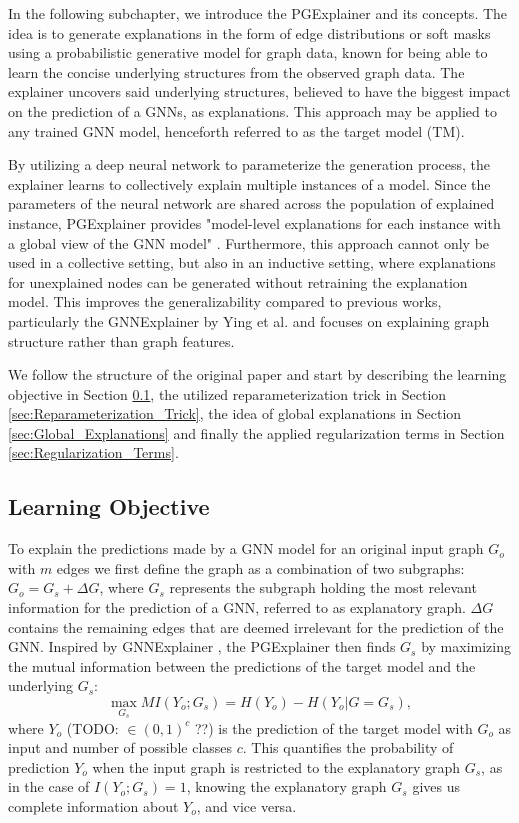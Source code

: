 In the following subchapter, we introduce the PGExplainer \cite{luo2020parameterized} and its concepts. The idea is to generate explanations in the form of edge distributions or soft masks using a probabilistic generative model for graph data, known for being able to learn the concise underlying structures from the observed graph data. The explainer uncovers said underlying structures, believed to have the biggest impact on the prediction of a GNNs, as explanations. This approach may be applied to any trained GNN model, henceforth referred to as the target model (TM). 

By utilizing a deep neural network to parameterize the generation process, the explainer learns to collectively explain multiple instances of a model. Since the parameters of the neural network are shared across the population of explained instance, PGExplainer provides "model-level explanations for each instance with a global view of the GNN model" \cite{luo2020parameterized}. Furthermore, this approach cannot only be used in a collective setting, but also in an inductive setting, where explanations for unexplained nodes can be generated without retraining the explanation model. This improves the generalizability compared to previous works, particularly the GNNExplainer by Ying et al. \cite{ying2019gnnexplainer} and focuses on explaining graph structure rather than graph features. \bigskip

We follow the structure of the original paper \cite{luo2020parameterized} and start by describing the learning objective in Section \ref{sec:learning_objective}, the utilized reparameterization trick in Section \ref{sec:Reparameterization_Trick}, the idea of global explanations in Section \ref{sec:Global_Explanations} and finally the applied regularization terms in Section \ref{sec:Regularization_Terms}.

\subsection{Learning Objective}
\label{sec:learning_objective}
To explain the predictions made by a GNN model for an original input graph $G_o$ with $m$ edges we first define the graph as a combination of two subgraphs: $G_o = G_s + \Delta G$, where $G_s$ represents the subgraph holding the most relevant information for the prediction of a GNN, referred to as explanatory graph. $\Delta G$ contains the remaining edges that are deemed irrelevant for the prediction of the GNN. Inspired by GNNExplainer \cite{ying2019gnnexplainer}, the PGExplainer then finds $G_s$ by maximizing the mutual information between the predictions of the target model and the underlying $G_s$:
\begin{equation}
    \max_{G_s} MI(Y_o;G_s) = H(Y_o) - H(Y_o|G=G_s),
\end{equation} 
where $Y_o$ (TODO: $\in (0,1)^c$ ??) is the prediction of the target model with $G_o$ as input and number of possible classes $c$. This quantifies the probability of prediction $Y_o$ when the input graph is restricted to the explanatory graph $G_s$, as in the case of $I(Y_o;G_s) = 1$, knowing the explanatory graph $G_s$ gives us complete information about $Y_o$, and vice versa.

